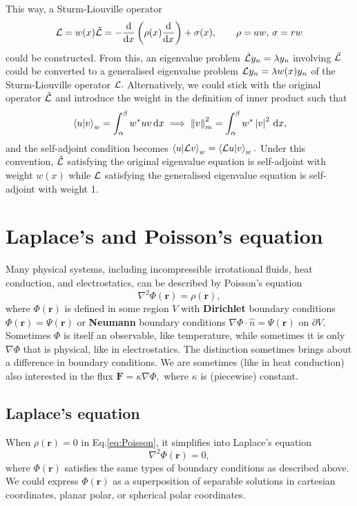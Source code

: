 \documentclass{article}
\begin{document}
This way, a Sturm-Liouville operator
\[
    \mathcal{\MakeUppercase{L}} = w(x) \tilde{\mathcal{\MakeUppercase{L}} }
    = -\frac{\mathrm{d}}{\mathrm{d}x} \left( \rho (x) \frac{\mathrm{d}}{\mathrm{d}x} \right) + \sigma (x), \qquad 
    \rho = a w, \, \sigma  = r w 
\]
could be constructed. From this, an eigenvalue problem $\tilde{\mathcal{\MakeUppercase{L}} } y_n = \lambda y_n$ involving $\tilde{\mathcal{\MakeUppercase{L}} }$ could be converted to a generalised eigenvalue problem $\mathcal{\MakeUppercase{L}} y_n = \lambda w(x) y_n$ of the Sturm-Liouville operator $\mathcal{\MakeUppercase{L}}.$ Alternatively, we could stick with the original operator $\tilde{\mathcal{\MakeUppercase{L}}}$ and introduce the weight in the definition of inner product such that
\[
    \braket*{u}{v}_w = \int_{\alpha }^{\beta } w^* u v \,\mathrm{d}x 
    \implies \left\lVert v\right\rVert ^{2}_m = \int_{\alpha }^{\beta } w^* \left\vert v \right\vert ^{2}  \,\mathrm{d}x, 
\]
and the self-adjoint condition becomes 
\( 
    \braket{u}{\mathcal{\MakeUppercase{L}} v}_w = \braket{\mathcal{\MakeUppercase{L}} u}{v}_w.
\) 
Under this convention, $\tilde{\mathcal{\MakeUppercase{L}} }$ satisfying the original eigenvalue equation is self-adjoint with weight $w(x)$ while $\mathcal{\MakeUppercase{L}} $ satisfying the generalised eigenvalue equation is self-adjoint with weight 1. 

\section{Laplace's and Poisson's equation}
Many physical systems, including incompressible irrotational fluids, heat conduction, and electrostatics, can be described by Poisson's equation 
\begin{equation}
    \nabla^{2} \Phi(\mathbf{r}) = \rho(\mathbf{r}), 
    \label{eq:Poisson}
\end{equation}
where $\Phi(\mathbf{r})$ is defined in some region $V$ with \textbf{Dirichlet} boundary conditions $\Phi(\mathbf{r} ) = \Psi(\mathbf{r})$ or \textbf{Neumann} boundary conditions $\nabla \Phi \cdot \hat{n} = \Psi(\mathbf{r} )$ on $\partial V.$ Sometimes $\Phi$ is itself an observable, like temperature, while sometimes it is only $\nabla \Phi$ that is physical, like in electrostatics. The distinction sometimes brings about a difference in boundary conditions. We are sometimes (like in heat conduction) also interested in the flux $\mathbf{F} = \kappa \nabla \Phi,$ where $\kappa$ is (piecewise) constant. 

\subsection{Laplace's equation}
When $\rho(\mathbf{r}) = 0$ in Eq.\eqref{eq:Poisson}, it simplifies into Laplace's equation 
\[
    \nabla^{2} \Phi(\mathbf{r} ) = 0,
\]
where $\Phi(\mathbf{r})$ satisfies the same types of boundary conditions as described above. We could express $\Phi (\mathbf{r} )$ as a superposition of separable solutions in cartesian coordinates, planar polar, or spherical polar coordinates. 
\end{document}
